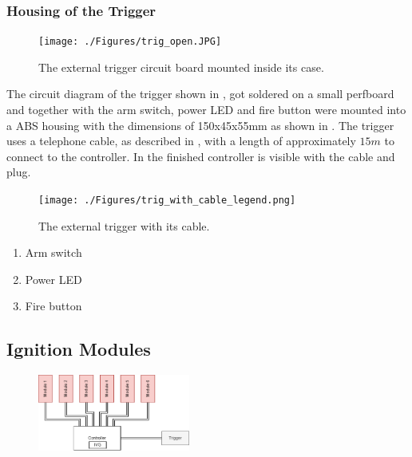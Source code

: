 \subsubsection{Housing of the Trigger}

\begin{figure}[!ht]
    \centering
    \texttt{[image: ./Figures/trig\_open.JPG]}
    \caption{The external trigger circuit board mounted inside its case.}
    \label{fig:trig_open}     
\end{figure}

\noindent The circuit diagram of the trigger shown in , got soldered on a small perfboard and together with the arm switch, power LED and fire button were mounted into a ABS housing with the dimensions of 150x45x55mm as shown in . The trigger uses a telephone cable, as described in , with a length of approximately $15m$ to connect to the controller. In  the finished controller is visible with the cable and plug.

\begin{figure}[!ht]
    \centering
    \texttt{[image: ./Figures/trig\_with\_cable\_legend.png]}
    \caption{The external trigger with its cable.}
    \label{fig:trig_with_cable_legend}     
\end{figure}

\begin{enumerate}
	\item Arm switch
	\item Power LED
	\item Fire button
\end{enumerate}

\pagebreak

\subsection{Ignition Modules}
\label{Ignition Modules}

\begin{figure}[!ht]
    \centering
    \includegraphics[width=5cm]{./Figures/concept_modules.png} 
\end{figure}

